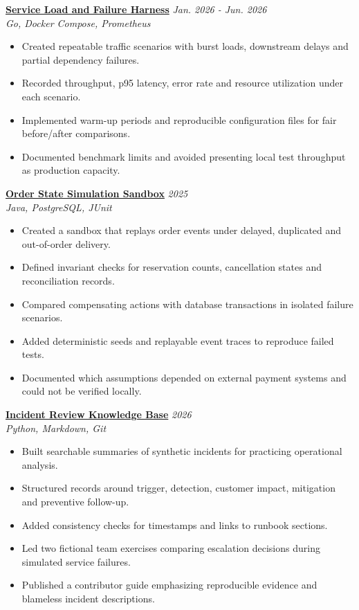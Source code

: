 \documentclass[11pt,a4paper]{article}
\begin{document}
\textbf{\href{https://example.com/demos/load-harness}{Service Load and Failure Harness}} \hfill \textit{Jan. 2026 - Jun. 2026}\\
\textit{Go, Docker Compose, Prometheus}
\begin{itemize}[leftmargin=*,noitemsep,topsep=2pt]
\item Created repeatable traffic scenarios with burst loads, downstream delays and partial dependency failures.
\item Recorded throughput, p95 latency, error rate and resource utilization under each scenario.
\item Implemented warm-up periods and reproducible configuration files for fair before/after comparisons.
\item Documented benchmark limits and avoided presenting local test throughput as production capacity.
\end{itemize}

\textbf{\href{https://example.com/demos/order-state-simulation-sandbox}{Order State Simulation Sandbox}} \hfill \textit{2025}\\
\textit{Java, PostgreSQL, JUnit}
\begin{itemize}[leftmargin=*,noitemsep,topsep=2pt]
\item Created a sandbox that replays order events under delayed, duplicated and out-of-order delivery.
\item Defined invariant checks for reservation counts, cancellation states and reconciliation records.
\item Compared compensating actions with database transactions in isolated failure scenarios.
\item Added deterministic seeds and replayable event traces to reproduce failed tests.
\item Documented which assumptions depended on external payment systems and could not be verified locally.
\end{itemize}

\textbf{\href{https://example.com/demos/incident-review-knowledge-base}{Incident Review Knowledge Base}} \hfill \textit{2026}\\
\textit{Python, Markdown, Git}
\begin{itemize}[leftmargin=*,noitemsep,topsep=2pt]
\item Built searchable summaries of synthetic incidents for practicing operational analysis.
\item Structured records around trigger, detection, customer impact, mitigation and preventive follow-up.
\item Added consistency checks for timestamps and links to runbook sections.
\item Led two fictional team exercises comparing escalation decisions during simulated service failures.
\item Published a contributor guide emphasizing reproducible evidence and blameless incident descriptions.
\end{itemize}
\end{document}
